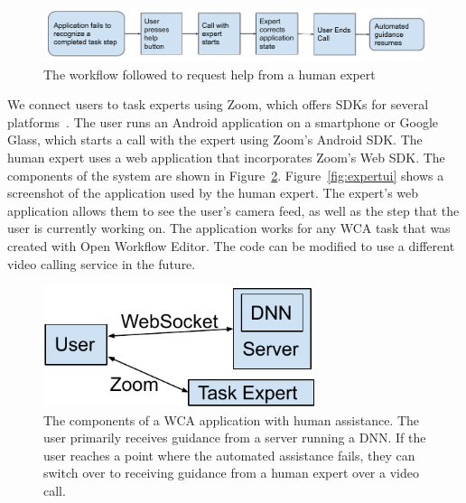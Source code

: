 \begin{figure}[h]
  \includegraphics[width=\textwidth]{figures/zoom_workflow.pdf}
  \caption{
    The workflow followed to request help from a human expert
  }\label{fig:zoom_workflow}
\end{figure}

We connect users to task experts using Zoom, which offers SDKs for several
platforms~\cite{zoom}.
The user runs an Android application on a
smartphone or Google Glass, which starts a call with the expert using Zoom's
Android SDK.
The human expert uses a web application that incorporates Zoom's Web SDK.
The components of the system are shown in Figure~{\ref{fig:expert_components}}.
Figure~{\ref{fig:expertui}} shows a screenshot of the application used by the
human expert.
The expert's web application allows them to see the user's camera feed, as well
as the step that the user is currently working on.
The application works for any WCA task that was created with Open Workflow
Editor.
The code can be modified to use a different video calling service in the future.

\begin{figure}[H]
  \includegraphics[width=8cm]{figures/human_assitance.pdf}
  \caption[The components of a WCA application with human assistance]{
    The components of a WCA application with human assistance.
    The user primarily receives guidance from a server running a DNN.
    If the user reaches a point where the automated assistance fails, they can
    switch over to receiving guidance from a human expert over a video call.
  }\label{fig:expert_components}
\end{figure}

